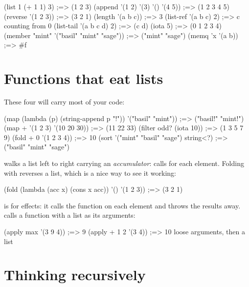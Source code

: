 \begin{scm}
(list 1 (+ 1 1) 3)                   ;=> (1 2 3)
(append '(1 2) '(3) '() '(4 5))      ;=> (1 2 3 4 5)
(reverse '(1 2 3))                   ;=> (3 2 1)
(length '(a b c))                    ;=> 3
(list-ref '(a b c) 2)                ;=> c          counting from 0
(list-tail '(a b c d) 2)             ;=> (c d)
(iota 5)                             ;=> (0 1 2 3 4)
(member "mint" '("basil" "mint" "sage"))   ;=> ("mint" "sage")
(memq 'x '(a b))                     ;=> #f
\end{scm}

\section{Functions that eat lists}

These four will carry most of your code:

\begin{scm}
(map (lambda (p) (string-append p "!")) '("basil" "mint"))
                                     ;=> ("basil!" "mint!")
(map + '(1 2 3) '(10 20 30))         ;=> (11 22 33)
(filter odd? (iota 10))              ;=> (1 3 5 7 9)
(fold + 0 '(1 2 3 4))                ;=> 10
(sort '("mint" "basil" "sage") string<?)
                                     ;=> ("basil" "mint" "sage")
\end{scm}

 walks a list left to right carrying an \emph{accumulator}:
 calls  for each element. Folding
with  reverses a list, which is a nice way to see it working:

\begin{scm}
(fold (lambda (acc x) (cons x acc)) '() '(1 2 3))   ;=> (3 2 1)
\end{scm}

 is  for effects: it calls the function on each
element and throws the results away.  calls a function with a
list as its arguments:

\begin{scm}
(apply max '(3 9 4))                 ;=> 9
(apply + 1 2 '(3 4))                 ;=> 10    loose arguments, then a list
\end{scm}

\section{Thinking recursively}

